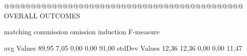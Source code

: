  @@@@@@@@@@@@@@@@@@@@@@@@@@@@@@@@@@@@@@@@@@@@@ OVERALL OUTCOMES

                matching commission   omission  induction   F-measure

avg Values       89,95       7,05       0,00       0,00       91,00        
stdDev Values    12,36       12,36       0,00       0,00        11,47        
